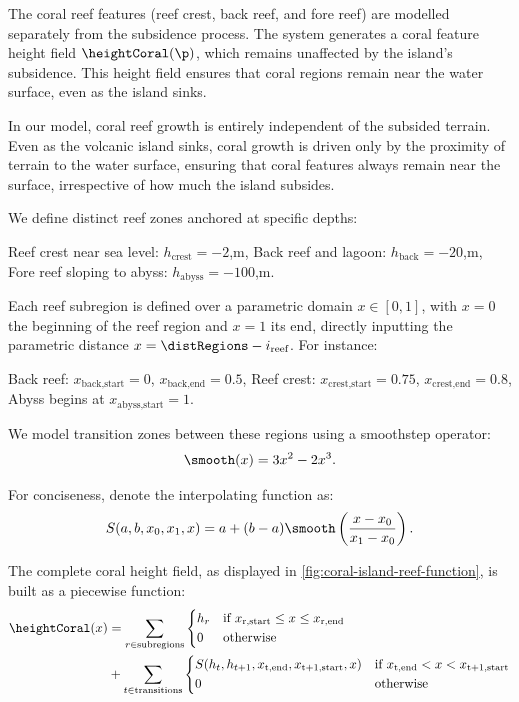 The coral reef features (reef crest, back reef, and fore reef) are modelled separately from the subsidence process. The system generates a coral feature height field $\heightCoral(\p)$, which remains unaffected by the island's subsidence. This height field ensures that coral regions remain near the water surface, even as the island sinks.

In our model, coral reef growth is entirely independent of the subsided terrain. Even as the volcanic island sinks, coral growth is driven only by the proximity of terrain to the water surface, ensuring that coral features always remain near the surface, irrespective of how much the island subsides.

We define distinct reef zones anchored at specific depths:
\begin{Itemize}
\Item{} Reef crest near sea level: $h_\text{crest} = -2$,m,
\Item{} Back reef and lagoon: $h_\text{back} = -20$,m,
\Item{} Fore reef sloping to abyss: $h_\text{abyss} = -100$,m.
\end{Itemize}

Each reef subregion is defined over a parametric domain $x \in [0, 1]$, with $x=0$ the beginning of the reef region and $x=1$ its end, directly inputting the parametric distance $x = \distRegions - i_{\text{reef}}$. For instance:
\begin{Itemize}
\Item{} Back reef: $x_{\text{back,start}} = 0$, $x_{\text{back,end}} = 0.5$,
\Item{} Reef crest: $x_{\text{crest,start}} = 0.75$, $x_{\text{crest,end}} = 0.8$,
\Item{} Abyss begins at $x_{\text{abyss,start}} = 1$.
\end{Itemize}

We model transition zones between these regions using a smoothstep operator:
\begin{align}
\smooth(x) = 3x^2 - 2x^3.
\end{align}

For conciseness, denote the interpolating function as:
\begin{align}
S(a, b, x_0, x_1, x) = a + (b-a) \smooth\left(\frac{x - x_0}{x_1 - x_0}\right).
\end{align}

The complete coral height field, as displayed in \cref{fig:coral-island-reef-function}, is built as a piecewise function:
\begin{align}
\label{eq:coral-island-full-reef-function}
\heightCoral(x) &= \sum_{r \in \text{subregions}}{
\begin{dcases}
h_r & \text{if } x_{\text{r,start}} \leq x \leq x_{\text{r,end}} \\
0 & \text{otherwise}
\end{dcases}
} \nonumber \\
&+
\sum_{t \in \text{transitions}} {
\begin{dcases}
S(h_{t}, h_{t+1}, x_{\text{t,end}}, x_{\text{t+1,start}}, x) & \text{if } x_{\text{t,end}} < x < x_{\text{t+1,start}} \\
0 & \text{otherwise}
\end{dcases}
}
\end{align}

